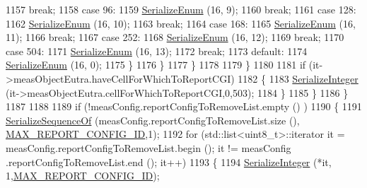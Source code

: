 \begin{DoxyCode}
1157                           \textcolor{keywordflow}{break};
1158                         \textcolor{keywordflow}{case} 96:
1159                           \hyperlink{classns3_1_1Asn1Header_ac8e56956823ab8e4470c09e162e7bf24}{SerializeEnum} (16, 9);
1160                           \textcolor{keywordflow}{break};
1161                         \textcolor{keywordflow}{case} 128:
1162                           \hyperlink{classns3_1_1Asn1Header_ac8e56956823ab8e4470c09e162e7bf24}{SerializeEnum} (16, 10);
1163                           \textcolor{keywordflow}{break};
1164                         \textcolor{keywordflow}{case} 168:
1165                           \hyperlink{classns3_1_1Asn1Header_ac8e56956823ab8e4470c09e162e7bf24}{SerializeEnum} (16, 11);
1166                           \textcolor{keywordflow}{break};
1167                         \textcolor{keywordflow}{case} 252:
1168                           \hyperlink{classns3_1_1Asn1Header_ac8e56956823ab8e4470c09e162e7bf24}{SerializeEnum} (16, 12);
1169                           \textcolor{keywordflow}{break};
1170                         \textcolor{keywordflow}{case} 504:
1171                           \hyperlink{classns3_1_1Asn1Header_ac8e56956823ab8e4470c09e162e7bf24}{SerializeEnum} (16, 13);
1172                           \textcolor{keywordflow}{break};
1173                         \textcolor{keywordflow}{default}:
1174                           \hyperlink{classns3_1_1Asn1Header_ac8e56956823ab8e4470c09e162e7bf24}{SerializeEnum} (16, 0);
1175                         \}
1176                     \}
1177                 \}
1178 
1179             \}
1180 
1181           \textcolor{keywordflow}{if} (it->measObjectEutra.haveCellForWhichToReportCGI)
1182             \{
1183               \hyperlink{classns3_1_1Asn1Header_ab1c3bd37730affa7473bc759d625c29a}{SerializeInteger} (it->measObjectEutra.cellForWhichToReportCGI,0,503);
1184             \}
1185         \}
1186     \}
1187 
1188 
1189   \textcolor{keywordflow}{if} (!measConfig.reportConfigToRemoveList.empty () )
1190     \{
1191       \hyperlink{classns3_1_1Asn1Header_a066b6dd077bde6b0c243f3eda2621277}{SerializeSequenceOf} (measConfig.reportConfigToRemoveList.size (),
      \hyperlink{lte-rrc-header_8cc_af8a3b931c04f0fa0e31e7c8480ba0bb6}{MAX\_REPORT\_CONFIG\_ID},1);
1192       \textcolor{keywordflow}{for} (std::list<uint8\_t>::iterator it = measConfig.reportConfigToRemoveList.begin (); it != measConfig
      .reportConfigToRemoveList.end (); it++)
1193         \{
1194           \hyperlink{classns3_1_1Asn1Header_ab1c3bd37730affa7473bc759d625c29a}{SerializeInteger} (*it, 1,\hyperlink{lte-rrc-header_8cc_af8a3b931c04f0fa0e31e7c8480ba0bb6}{MAX\_REPORT\_CONFIG\_ID});

\end{DoxyCode}
